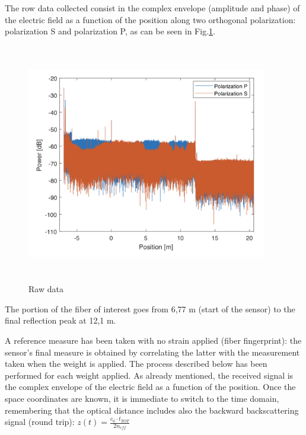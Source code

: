 The row data collected consist in the complex envelope (amplitude and phase) of the electric field as a function of the position along two orthogonal polarization: polarization S and polarization P, as can be seen in Fig.\ref{fig:raw}.
\begin{figure}[H]
	\centering
	\includegraphics[height=10.5cm, width=10.5cm, keepaspectratio]{img/raw.png}
	\caption{Raw data}\label{fig:raw}
\end{figure}

The portion of the fiber of interest goes from 6,77 m (start of the sensor) to the final reflection peak at 12,1 m.


A reference measure has been taken with no strain applied (fiber fingerprint): the sensor's final measure is obtained by correlating the latter with the measurement taken when the weight is applied.
The process described below has been performed for each weight applied.
As already mentioned, the received signal is the complex envelope of the electric field as a function of the position. Once the space coordinates are known, it is immediate to switch to the time domain, remembering that the optical distance includes also the backward backscattering signal (round trip): $z(t) = \frac{c_0 \cdot t_{TOT}}{2 n_{eff}}$

